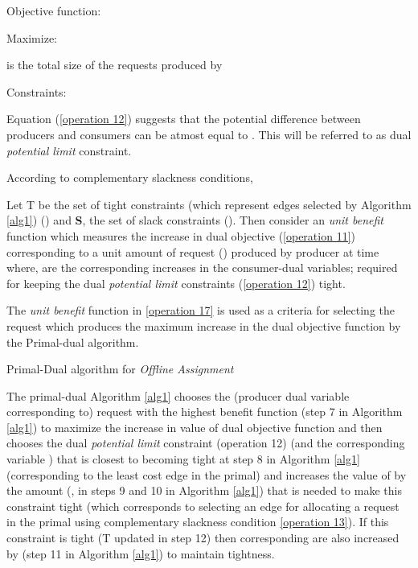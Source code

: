 \documentclass{llncs}
\begin{document}
Objective function:

Maximize:



 is the total size of the requests produced by  

Constraints:


Equation (\ref{operation 12}) suggests that the potential difference between producers and consumers can be atmost equal to . This will be referred to as dual \emph{potential limit} constraint.

According to complementary slackness conditions,


Let T be the set of tight constraints (which represent edges selected by Algorithm \ref{alg1}) \big(\big) and {\bf S}, the set of slack constraints \big(\big). Then consider an \emph{unit benefit} function which measures the increase in dual objective (\ref{operation 11}) corresponding to a unit amount of request \big(\big) produced by producer  at time  where,  are the corresponding increases in the consumer-dual variables; required for keeping the dual \emph{potential limit} constraints (\ref{operation 12}) tight.



The \emph{unit benefit} function in \ref{operation 17} is used as a criteria for selecting the request which produces the maximum increase in the dual objective function by the Primal-dual algorithm.

\begin{algorithm}[H]
\caption{Primal-Dual algorithm for \emph{Offline Assignment}}
\label{alg1}
\begin{algorithmic}[1]
\STATE 
\STATE 
\STATE 
\STATE 
\STATE 
\WHILE{ }
\STATE 
\STATE 
\STATE 
\STATE 
\STATE 
\STATE 
\STATE 
\STATE 
\STATE 
\ENDWHILE
\end{algorithmic}
\end{algorithm}

 The primal-dual Algorithm \ref{alg1} chooses the (producer dual variable  corresponding to) request  with the highest benefit function  (step 7 in Algorithm \ref{alg1}) to maximize the increase in value of dual objective function and then chooses the dual \emph{potential limit} constraint ({operation 12}) (and the corresponding variable ) that is closest to becoming tight at step 8 in Algorithm \ref{alg1}  (corresponding to the least cost edge in the primal) and increases the value of  by the amount (, in steps 9 and 10 in Algorithm \ref{alg1}) that is needed to make this constraint tight (which corresponds to selecting an edge for allocating a request in the primal using complementary slackness condition \ref{operation 13}). If this constraint is tight (T updated in step 12) then corresponding  are also increased by  (step 11 in Algorithm \ref{alg1}) to maintain tightness. 
\end{document}
